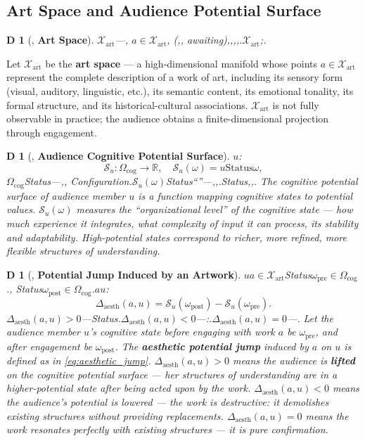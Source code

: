 \documentclass[12pt,a4paper]{article}
\newtheorem{definition}[theorem]Definition
\theoremstyle{remark}
\newcommand{\R}{\mathbb{R}}
\newcommand{\Sstates}{\mathcal{S}}
\newcommand{\ArtSpace}{\mathcal{X}_{\text{art}}}
\newcommand{\AesthDelta}{\Delta_{\text{aesth}}}
\begin{document}
\subsection{Art Space and Audience Potential Surface}
\begin{definition}[, \textbf{Art Space}]
\label{def:art_space}
$\ArtSpace$---, $a \in \ArtSpace$, (,, awaiting),,,,.$\ArtSpace$;.
\end{definition}
Let $\ArtSpace$ be the \textbf{art space} --- a high-dimensional manifold whose points $a \in \ArtSpace$ represent the complete description of a work of art, including its sensory form (visual, auditory, linguistic, etc.), its semantic content, its emotional tonality, its formal structure, and its historical-cultural associations. $\ArtSpace$ is not fully observable in practice; the audience obtains a finite-dimensional projection through engagement.
\begin{definition}[, \textbf{Audience Cognitive Potential Surface}]
\label{def:audience_potential}
$u$: 
\begin{equation}
 \Sstates_u: \Omega_{\text{cog}} \to \R, \quad \Sstates_u(\omega) = \text{$u$Status$\omega$},
\end{equation}
$\Omega_{\text{cog}}$Status---,, Configuration.$\Sstates_u(\omega)$Status``''---,,.Status,,.
The cognitive potential surface of audience member $u$ is a function mapping cognitive states to potential values. $\Sstates_u(\omega)$ measures the ``organizational level'' of the cognitive state --- how much experience it integrates, what complexity of input it can process, its stability and adaptability. High-potential states correspond to richer, more refined, more flexible structures of understanding.
\end{definition}
\begin{definition}[, \textbf{Potential Jump Induced by an Artwork}]
\label{def:art_potential_jump}
$u$$a \in \ArtSpace$Status$\omega_{\text{pre}} \in \Omega_{\text{cog}}$., Status$\omega_{\text{post}} \in \Omega_{\text{cog}}$.$a$$u$: 
\begin{equation}\label{eq:aesthetic_jump}
 \AesthDelta(a, u) = \Sstates_u(\omega_{\text{post}}) - \Sstates_u(\omega_{\text{pre}}).
\end{equation}
$\AesthDelta(a, u) > 0$---Status.$\AesthDelta(a, u) < 0$---:.$\AesthDelta(a, u) = 0$---.
Let the audience member $u$'s cognitive state before engaging with work $a$ be $\omega_{\text{pre}}$, and after engagement be $\omega_{\text{post}}$. The \textbf{aesthetic potential jump} induced by $a$ on $u$ is defined as in \eqref{eq:aesthetic_jump}. $\AesthDelta(a, u) > 0$ means the audience is \textbf{lifted} on the cognitive potential surface --- her structures of understanding are in a higher-potential state after being acted upon by the work. $\AesthDelta(a, u) < 0$ means the audience's potential is lowered --- the work is destructive: it demolishes existing structures without providing replacements. $\AesthDelta(a, u) = 0$ means the work resonates perfectly with existing structures --- it is pure confirmation.
\end{definition}
\end{document}
